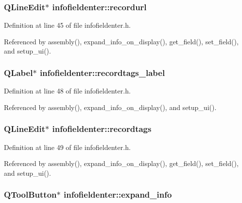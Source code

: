 \subsubsection{\setlength{\rightskip}{0pt plus 5cm}QLine\-Edit$\ast$ {\bf infofieldenter::recordurl}\hspace{0.3cm}{\tt  [private]}}\label{classinfofieldenter_faa3049ed6ee380bde57cd54e4673052}




Definition at line 45 of file infofieldenter.h.

Referenced by assembly(), expand\_\-info\_\-on\_\-display(), get\_\-field(), set\_\-field(), and setup\_\-ui().
\subsubsection{\setlength{\rightskip}{0pt plus 5cm}QLabel$\ast$ {\bf infofieldenter::recordtags\_\-label}\hspace{0.3cm}{\tt  [private]}}\label{classinfofieldenter_aee4df3556027801ad97d16ebc51cfc8}




Definition at line 48 of file infofieldenter.h.

Referenced by assembly(), expand\_\-info\_\-on\_\-display(), and setup\_\-ui().
\subsubsection{\setlength{\rightskip}{0pt plus 5cm}QLine\-Edit$\ast$ {\bf infofieldenter::recordtags}\hspace{0.3cm}{\tt  [private]}}\label{classinfofieldenter_8d04fa9810cddeab8154069924f51f52}




Definition at line 49 of file infofieldenter.h.

Referenced by assembly(), expand\_\-info\_\-on\_\-display(), get\_\-field(), set\_\-field(), and setup\_\-ui().
\subsubsection{\setlength{\rightskip}{0pt plus 5cm}QTool\-Button$\ast$ {\bf infofieldenter::expand\_\-info}\hspace{0.3cm}{\tt  [private]}}\label{classinfofieldenter_d8caf1d9f6c55fda34df8ace07e48251}




